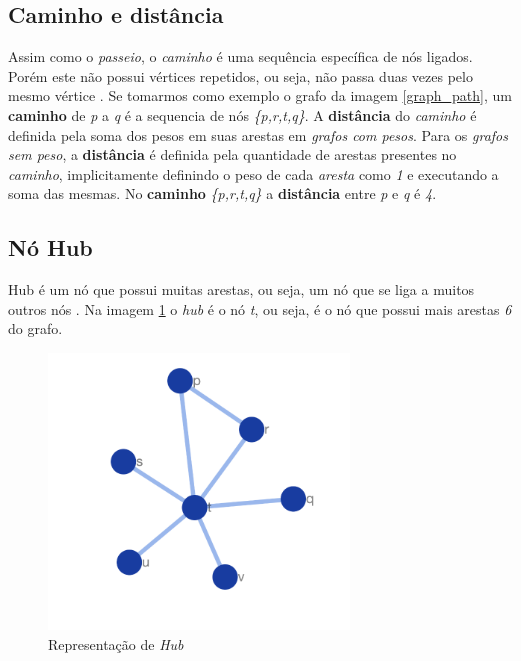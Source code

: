 \subsection{Caminho e distância}
Assim como o \textit{passeio}, o \textit{caminho} é uma sequência específica de nós ligados. Porém este não possui vértices repetidos, ou seja, não passa duas vezes pelo mesmo vértice \cite{Pavlopoulos2011}. 
Se tomarmos como exemplo o grafo da imagem \ref{graph_path}, um \textbf{caminho} de \textit{p} a \textit{q} é a sequencia de nós \textit{\{p,r,t,q\}}. 
A \textbf{distância} do \textit{caminho} é definida pela soma dos pesos em suas arestas em \textit{grafos com pesos}. Para os \textit{grafos sem peso}, a \textbf{distância} é definida pela quantidade de arestas presentes no \textit{caminho}, implicitamente definindo o peso de cada \textit{aresta} como \textit{1} e executando a soma das mesmas.
No \textbf{caminho} \textit{\{p,r,t,q\}} a \textbf{distância} entre \textit{p} e \textit{q} é \textit{4}.





\subsection{Nó Hub}
Hub é um nó que possui muitas arestas, ou seja, um nó que se liga a muitos outros nós \cite{Pavlopoulos2011}.
Na imagem \ref{graph_hub} o \textsl{hub} é o nó \textsl{t}, ou seja, é o nó que possui mais arestas \textsl{6} do grafo.
%
\begin{figure}[ht!]
\centering
\includegraphics[width=80mm]{Images/graph_hub.png}
\caption {Representação de \textsl{Hub}
\label{graph_hub}}
\end{figure}


